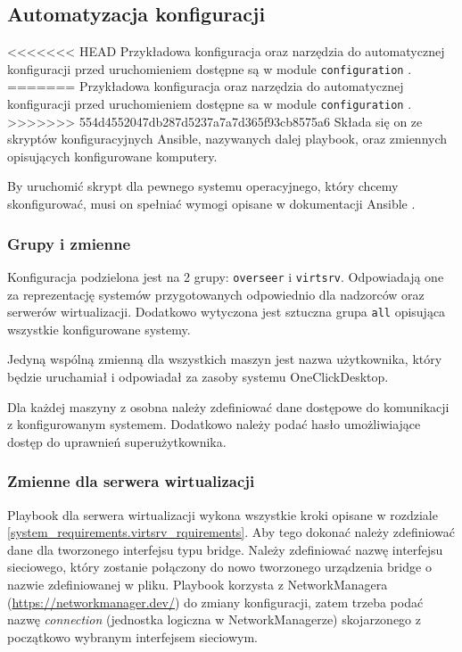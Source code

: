 \documentclass[../opis-rozwiazania.tex]{subfiles}
\begin{document}
\subsection{Automatyzacja konfiguracji}
\label{system_requirements.ansible_conf}
<<<<<<< HEAD
Przykładowa konfiguracja oraz narzędzia do automatycznej konfiguracji przed uruchomieniem dostępne są w module \texttt{configuration} \parencite{ocd-configuration}.
=======
Przykładowa konfiguracja oraz narzędzia do automatycznej konfiguracji przed uruchomieniem dostępne sa w module \texttt{configuration} \parencite{ocd-configuration}.
>>>>>>> 554d4552047db287d5237a7a7d365f93cb8575a6
Składa się on ze skryptów konfiguracyjnych Ansible, nazywanych dalej playbook, oraz zmiennych opisujących konfigurowane komputery.

By uruchomić skrypt dla pewnego systemu operacyjnego, który chcemy skonfigurować, musi on spełniać wymogi opisane w dokumentacji Ansible \parencite{ansible-connection}.

\subsubsection{Grupy i zmienne}
Konfiguracja podzielona jest na 2 grupy: \texttt{overseer} i \texttt{virtsrv}.
Odpowiadają one za reprezentację systemów przygotowanych odpowiednio dla nadzorców oraz serwerów wirtualizacji.
Dodatkowo wytyczona jest sztuczna grupa \texttt{all} opisująca wszystkie konfigurowane systemy.

Jedyną wspólną zmienną dla wszystkich maszyn jest nazwa użytkownika, który będzie uruchamiał i odpowiadał za zasoby systemu OneClickDesktop.

Dla każdej maszyny z osobna należy zdefiniować dane dostępowe do komunikacji z konfigurowanym systemem. Dodatkowo należy podać hasło umożliwiające dostęp do uprawnień superużytkownika.

\subsubsection{Zmienne dla serwera wirtualizacji}
Playbook dla serwera wirtualizacji wykona wszystkie kroki opisane w rozdziale \ref{system_requirements.virtsrv_rquirements}.
Aby tego dokonać należy zdefiniować dane dla tworzonego interfejsu typu bridge.
Należy zdefiniować nazwę interfejsu sieciowego, który zostanie połączony do nowo tworzonego urządzenia bridge o nazwie zdefiniowanej w pliku.
Playbook korzysta z NetworkManagera (\url{https://networkmanager.dev/}) do zmiany konfiguracji, zatem trzeba podać nazwę \textit{connection} (jednostka logiczna w NetworkManagerze) skojarzonego z początkowo wybranym interfejsem sieciowym.
\end{document}
